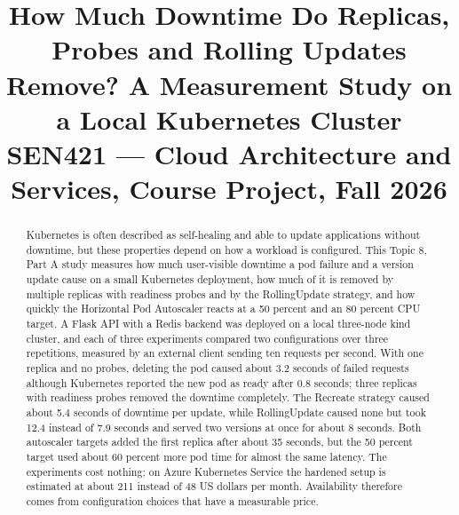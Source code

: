 \documentclass[conference,a4paper]{IEEEtran}
\begin{document}
\title{How Much Downtime Do Replicas, Probes and Rolling Updates Remove? A Measurement Study on a Local Kubernetes Cluster\\[10pt]
	{\normalsize SEN421 --- Cloud Architecture and Services, Course Project, Fall 2026}
}

\author{
}

\maketitle

\begin{abstract}
Kubernetes is often described as self-healing and able to update applications without downtime, but these properties depend on how a workload is configured. This Topic 8, Part A study measures how much user-visible downtime a pod failure and a version update cause on a small Kubernetes deployment, how much of it is removed by multiple replicas with readiness probes and by the RollingUpdate strategy, and how quickly the Horizontal Pod Autoscaler reacts at a 50 percent and an 80 percent CPU target. A Flask API with a Redis backend was deployed on a local three-node kind cluster, and each of three experiments compared two configurations over three repetitions, measured by an external client sending ten requests per second. With one replica and no probes, deleting the pod caused about 3.2 seconds of failed requests although Kubernetes reported the new pod as ready after 0.8 seconds; three replicas with readiness probes removed the downtime completely. The Recreate strategy caused about 5.4 seconds of downtime per update, while RollingUpdate caused none but took 12.4 instead of 7.9 seconds and served two versions at once for about 8 seconds. Both autoscaler targets added the first replica after about 35 seconds, but the 50 percent target used about 60 percent more pod time for almost the same latency. The experiments cost nothing; on Azure Kubernetes Service the hardened setup is estimated at about 211 instead of 48 US dollars per month. Availability therefore comes from configuration choices that have a measurable price.
\end{abstract}
\end{document}
